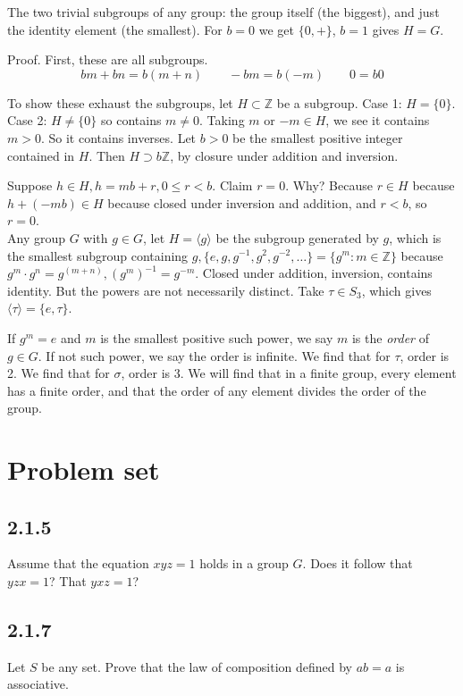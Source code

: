 \documentclass[12pt]{article}
\theoremstyle{definition}
\begin{document}
The two trivial subgroups of any group: the group itself (the biggest), and just the identity element (the smallest).
For \(b=0\) we get \(\{0, +\}\), \(b=1\) gives \(H = G\).

Proof. First, these are all subgroups.
\[bm + bn = b(m+n)\qquad -bm = b(-m)\qquad 0=b0\]

To show these exhaust the subgroups, let \(H \subset \mathbb{Z}\) be a subgroup.
Case 1: \(H = \{0\}\). Case 2: \(H \ne \{0\}\) so contains \(m \ne 0\). Taking \(m\) or \(-m\in H\), we see it contains \(m > 0\).
So it contains inverses. Let \(b > 0\) be the smallest positive integer contained in \(H\). Then \(H\supset b\mathbb{Z}\), by closure under addition and inversion.

Suppose \(h \in H, h = mb + r, 0 \le r < b\). Claim \(r = 0\). Why? Because \(r \in H\) because \(h + (-mb) \in H\) because closed under inversion and addition,
and \(r < b\), so \(r = 0\).
\\
Any group \(G\) with \(g \in G\), let \(H = \langle g\rangle\) be the subgroup generated by \(g\), which is the smallest subgroup
containing \(g, \{e, g, g^{-1}, g^2, g^{-2}, \ldots\} = \{g^m : m \in \mathbb{Z}\}\) because \(g^m\cdot g^n = g^(m + n), (g^m)^{-1}=g^{-m}\).
Closed under addition, inversion, contains identity. But the powers are not necessarily distinct. Take \(\tau\in S_3\), which gives \(\langle \tau\rangle=\{e, \tau\}\).

If \(g^m = e\) and \(m\) is the smallest positive such power, we say \(m\) is the \emph{order} of \(g \in G\). If not such power, we say the order is infinite.
We find that for \(\tau\), order is 2. We find that for \(\sigma\), order is 3. We will find that in a finite group, every element has a finite order, and that the order of any element divides the order of the group.



\section*{Problem set}
\subsection*{2.1.5}
Assume that the equation \(xyz = 1\) holds in a group \(G\). Does it follow that \(yzx = 1\)? That \(yxz = 1\)?
\subsection*{2.1.7}
Let \(S\) be any set. Prove that the law of composition defined by \(ab = a\) is associative.
\end{document}
